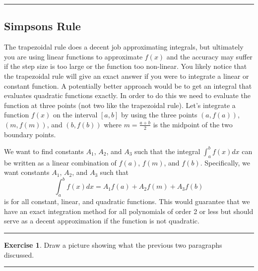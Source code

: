\documentclass[
]{book}
\theoremstyle{definition}
\theoremstyle{definition}
\theoremstyle{definition}
\newtheorem{exercise}{Exercise}[chapter]
\theoremstyle{remark}
\begin{document}
\begin{center}\rule{0.5\linewidth}{0.5pt}\end{center}

\hypertarget{simpsons-rule}{%
\subsection{Simpsons Rule}\label{simpsons-rule}}

The trapezoidal rule does a decent job approximating integrals, but
ultimately you are using linear functions to approximate \(f(x)\) and the
accuracy may suffer if the step size is too large or the function too
non-linear. You likely notice that the trapezoidal rule will give an
exact answer if you were to integrate a linear or constant function. A
potentially better approach would be to get an integral that evaluates
quadratic functions exactly. In order to do this we need to evaluate the
function at three points (not two like the trapezoidal rule). Let's
integrate a function \(f(x)\) on the interval \([a,b]\) by using the three
points \((a,f(a))\), \((m,f(m))\), and \((b,f(b))\) where \(m=\frac{a+b}{2}\) is
the midpoint of the two boundary points.

We want to find constants \(A_1\), \(A_2\), and \(A_3\) such that the integral
\(\int_a^b f(x) dx\) can be written as a linear combination of \(f(a)\),
\(f(m)\), and \(f(b)\). Specifically, we want constants \(A_1\), \(A_2\), and
\(A_3\) such that
\[\int_a^b f(x) dx = A_1 f(a) + A_2 f(m) + A_3 f(b)\]
is for all constant, linear, and quadratic functions. This would
guarantee that we have an exact integration method for all polynomials
of order 2 or less but should serve as a decent approximation if the
function is not quadratic.

\begin{center}\rule{0.5\linewidth}{0.5pt}\end{center}

\begin{exercise}
\protect\hypertarget{exr:unnamed-chunk-182}{}{\label{exr:unnamed-chunk-182} }Draw a picture showing what the previous two paragraphs discussed.
\end{exercise}

\begin{center}\rule{0.5\linewidth}{0.5pt}\end{center}
\end{document}
